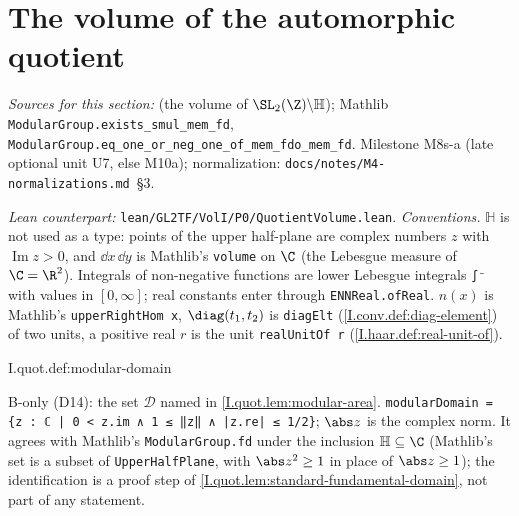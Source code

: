 \section{The volume of the automorphic quotient}\label{sec:quot-volume}

\noindent\emph{Sources for this section:} \cite[§1.6, Thm.~1.6.1]{Gold} (the volume of $\SL_2(\Z)\backslash\mathbb H$); Mathlib
\texttt{ModularGroup.\allowbreak exists\_smul\_mem\_fd}, \texttt{ModularGroup.\allowbreak eq\_one\_or\_neg\_one\_of\_mem\_fdo\_mem\_fd}. Milestone M8s-a
(late optional unit U7, else M10a); normalization: \texttt{docs/notes/M4-normalizations.md}~§3.

\noindent\emph{Lean counterpart:} \texttt{lean/GL2TF/VolI/P0/QuotientVolume.lean}. \emph{Conventions.} $\mathbb H$ is not used as a type: points
of the upper half-plane are complex numbers $z$ with $\operatorname{Im}z>0$, and $\dd x\,\dd y$ is Mathlib's \texttt{volume} on $\C$ (the Lebesgue
measure of $\C=\R^2$). Integrals of non-negative functions are lower Lebesgue integrals \texttt{∫⁻} with values in $[0,\infty]$; real constants
enter through \texttt{ENNReal.ofReal}. $n(x)$ is Mathlib's \texttt{upperRightHom x}, $\diag(t_1,t_2)$ is \texttt{diagElt} (\cref{I.conv.def:diag-element})
of two units, a positive real $r$ is the unit \texttt{realUnitOf r} (\cref{I.haar.def:real-unit-of}).

\begin{definition}
\bonly
{}
\end{definition}
\begin{tfformal}{I.quot.def:modular-domain}
\begin{tffidelity}
B-only (D14): the set $\mathcal D$ named in \cref{I.quot.lem:modular-area}. \texttt{modularDomain = \{z : ℂ | 0 < z.im ∧ 1 ≤ ‖z‖ ∧ |z.re| ≤ 1/2\}}; $\abs z$ is the complex norm. It agrees with Mathlib's \texttt{ModularGroup.fd} under the inclusion $\mathbb H\subseteq\C$ (Mathlib's set is a subset of \texttt{UpperHalfPlane}, with $\abs z^2\ge1$ in place of $\abs z\ge1$); the identification is a proof step of \cref{I.quot.lem:standard-fundamental-domain}, not part of any statement.
\end{tffidelity}
\end{tfformal}


